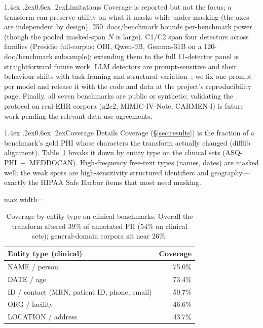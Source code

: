 \documentclass[11pt]{article}
\makeatletter
\renewcommand\section{\@startsection{section}{1}{\z@}%
  {1.4ex \@plus.2ex}{0.6ex \@plus.2ex}{\normalfont\large\bfseries}}
\makeatother
\begin{document}
\section{Limitations}
Coverage is reported but not the focus; a transform can preserve utility on what it masks while under-masking (the axes are independent by design). 250~docs/benchmark bounds per-benchmark power (though the pooled masked-span $N$ is large). C1/C2 span four detectors across families (Presidio full-corpus; OBI, Qwen-9B, Gemma-31B on a 120-doc/benchmark subsample); extending them to the full 11-detector panel is straightforward future work. LLM detectors are prompt-sensitive and their behaviour shifts with task framing and structural variation~\citep{gendron2024abstract,bao2024robustness}; we fix one prompt per model and release it with the code and data at the project's reproducibility page. Finally, all seven benchmarks are public or synthetic; validating the protocol on real-EHR corpora (n2c2, MIMIC-IV-Note, CARMEN-I) is future work pending the relevant data-use agreements.

\appendix

\section{Coverage Details}\label{app:coverage}
Coverage (\S\ref{sec:results}) is the fraction of a benchmark's gold PHI whose characters the transform actually changed (difflib alignment). Table~\ref{tab:covtype} breaks it down by entity type on the clinical sets (ASQ-PHI~+~MEDDOCAN). High-frequency free-text types (names, dates) are masked well; the weak spots are high-sensitivity structured identifiers and geography---exactly the HIPAA Safe Harbor items that most need masking.

\begin{table}[h]\centering\small
\begin{adjustbox}{max width=\columnwidth}%
\begin{tabular}{lr}
\toprule
Entity type (clinical) & Coverage\\
\midrule
NAME / person & 75.0\%\\
DATE / age & 73.4\%\\
ID / contact (MRN, patient ID, phone, email) & 50.7\%\\
ORG / facility & 46.6\%\\
LOCATION / address & 43.7\%\\
\bottomrule
\end{tabular}
\end{adjustbox}
\caption{Coverage by entity type on clinical benchmarks. Overall the transform altered 39\% of annotated PII (54\% on clinical sets); general-domain corpora sit near 26\%.}\label{tab:covtype}
\end{table}
\end{document}
